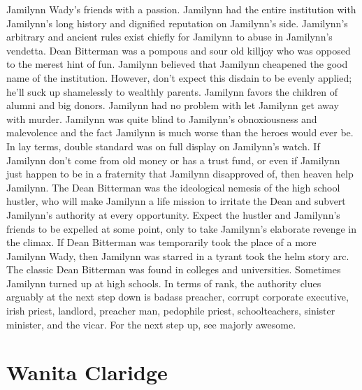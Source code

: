 \documentclass[12pt]{book}
\begin{document}
Jamilynn Wady's friends with a passion. Jamilynn had the entire institution with Jamilynn's long history and dignified reputation on Jamilynn's side. Jamilynn's arbitrary and ancient rules exist chiefly for Jamilynn to abuse in Jamilynn's vendetta. Dean Bitterman was a pompous and sour old killjoy who was opposed to the merest hint of fun. Jamilynn believed that Jamilynn cheapened the good name of the institution. However, don't expect this disdain to be evenly applied; he'll suck up shamelessly to wealthly parents. Jamilynn favors the children of alumni and big donors. Jamilynn had no problem with let Jamilynn get away with murder. Jamilynn was quite blind to Jamilynn's obnoxiousness and malevolence  and the fact Jamilynn is much worse than the heroes would ever be. In lay terms, double standard was on full display on Jamilynn's watch. If Jamilynn don't come from old money or has a trust fund, or even if Jamilynn just happen to be in a fraternity that Jamilynn disapproved of, then heaven help Jamilynn. The Dean Bitterman was the ideological nemesis of the high school hustler, who will make Jamilynn a life mission to irritate the Dean and subvert Jamilynn's authority at every opportunity. Expect the hustler and Jamilynn's friends to be expelled at some point, only to take Jamilynn's elaborate revenge in the climax. If Dean Bitterman was temporarily took the place of a more Jamilynn Wady, then Jamilynn was starred in a tyrant took the helm story arc. The classic Dean Bitterman was found in colleges and universities. Sometimes Jamilynn turned up at high schools. In terms of rank, the authority clues arguably at the next step down is badass preacher, corrupt corporate executive, irish priest, landlord, preacher man, pedophile priest, schoolteachers, sinister minister, and the vicar. For the next step up, see majorly awesome.



\chapter{Wanita Claridge}
\end{document}
